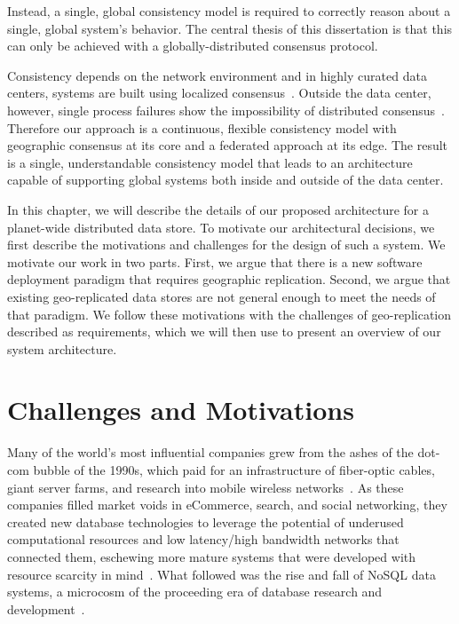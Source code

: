 Instead, a single, global consistency model is required to correctly reason about a single, global system's behavior.
The central thesis of this dissertation is that this can only be achieved with a globally-distributed consensus protocol.

Consistency depends on the network environment and in highly curated data centers, systems are built using localized consensus~\cite{bolosky_paxos_2011}.
Outside the data center, however, single process failures show the impossibility of distributed consensus~\cite{fischer_impossibility_1985}.
Therefore our approach is a continuous, flexible consistency model with geographic consensus at its core and a federated approach at its edge.
The result is a single, understandable consistency model that leads to an architecture capable of supporting global systems both inside and outside of the data center.

In this chapter, we will describe the details of our proposed architecture for a planet-wide distributed data store.
To motivate our architectural decisions, we first describe the motivations and challenges for the design of such a system.
We motivate our work in two parts.
First, we argue that there is a new software deployment paradigm that requires geographic replication.
Second, we argue that existing geo-replicated data stores are not general enough to meet the needs of that paradigm.
We follow these motivations with the challenges of geo-replication described as requirements, which we will then use to present an overview of our system architecture.

\section{Challenges and Motivations}

Many of the world's most influential companies grew from the ashes of the dot-com bubble of the 1990s, which paid for an infrastructure of fiber-optic cables, giant server farms, and research into mobile wireless networks~\cite{casey_blockchain_2018}.
As these companies filled market voids in eCommerce, search, and social networking, they created new database technologies to leverage the potential of underused computational resources and low latency/high bandwidth networks that connected them, eschewing more mature systems that were developed with resource scarcity in mind~\cite{stonebraker_what_2005,stonebraker_mapreduce_2010}.
What followed was the rise and fall of NoSQL data systems, a microcosm of the proceeding era of database research and development~\cite{mohan_history_2013}.

